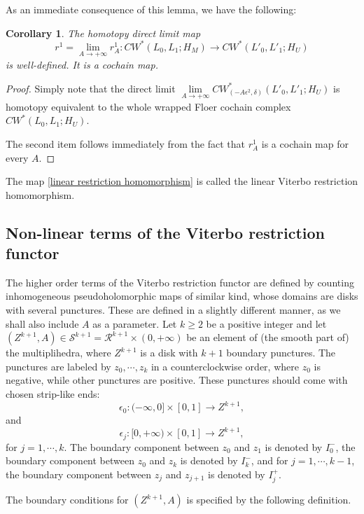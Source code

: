 \documentclass{amsart}
\newtheorem{corollary}[theorem]{Corollary}
\numberwithin{equation}{section}
\numberwithin{figure}{section}
\begin{document}
	As an immediate consequence of this lemma, we have the following: \par

\begin{corollary}
	The homotopy direct limit map
\begin{equation}\label{linear restriction homomorphism}
r^{1} = \lim\limits_{A \to +\infty} r^{1}_{A}: CW^{*}(L_{0}, L_{1}; H_{M}) \to CW^{*}(L'_{0}, L'_{1}; H_{U})
\end{equation}
is well-defined. It is a cochain map.
\end{corollary}
\begin{proof}
	Simply note that the direct limit $\lim\limits_{A \to +\infty} CW^{*}_{(-A\epsilon^{2}, \delta)}(L'_{0}, L'_{1}; H_{U})$ is homotopy equivalent to the whole wrapped Floer cochain complex $CW^{*}(L_{0}, L_{1}; H_{U})$. \par
	The second item follows immediately from the fact that $r^{1}_{A}$ is a cochain map for every $A$. \par
\end{proof}

	The map \eqref{linear restriction homomorphism} is called the linear Viterbo restriction homomorphism. \par

\subsection{Non-linear terms of the Viterbo restriction functor}
	The higher order terms of the Viterbo restriction functor are defined by counting inhomogeneous pseudoholomorphic maps of similar kind, whose domains are disks with several punctures. These are defined in a slightly different manner, as we shall also include $A$ as a parameter. Let $k \ge 2$ be a positive integer and let $(Z^{k+1}, A) \in \mathcal{S}^{k+1} = \mathcal{R}^{k+1} \times (0, +\infty)$ be an element of (the smooth part of) the multiplihedra, where $Z^{k+1}$ is a disk with $k+1$ boundary punctures. The punctures are labeled by $z_{0}, \cdots, z_{k}$ in a counterclockwise order, where $z_{0}$ is negative, while other punctures are positive. These punctures should come with chosen strip-like ends:
\begin{equation*}
\epsilon_{0}: (-\infty, 0] \times [0, 1] \to Z^{k+1},
\end{equation*}
and
\begin{equation*}
\epsilon_{j}: [0, +\infty) \times [0, 1] \to Z^{k+1},
\end{equation*}
for $j = 1, \cdots, k$. The boundary component between $z_{0}$ and $z_{1}$ is denoted by $I_{0}^{-}$, the boundary component between $z_{0}$ and $z_{k}$ is denoted by $I_{k}^{-}$, and for $j = 1, \cdots, k-1$, the boundary component between $z_{j}$ and $z_{j+1}$ is denoted by $I_{j}^{+}$. \par
	The boundary conditions for $(Z^{k+1}, A)$ is specified by the following definition. \par
\end{document}
